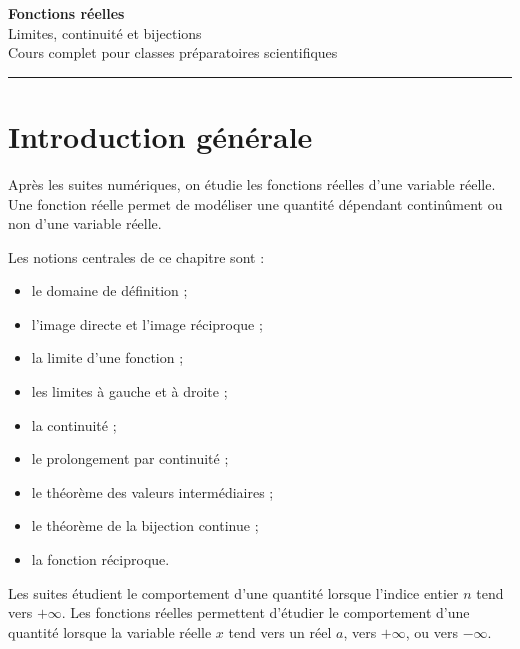 \documentclass[11pt,a4paper]{article}
\begin{document}
\begin{center}
    {\Huge \textbf{Fonctions réelles}}\\[2mm]
    {\Large Limites, continuité et bijections}\\[2mm]
    {\large Cours complet pour classes préparatoires scientifiques}\\[2mm]
    \rule{0.88\linewidth}{0.5pt}
\end{center}

\vspace{0.4cm}

\tableofcontents

\newpage

\section*{Introduction générale}

Après les suites numériques, on étudie les fonctions réelles d'une variable réelle.  
Une fonction réelle permet de modéliser une quantité dépendant continûment ou non d'une variable réelle.

Les notions centrales de ce chapitre sont :
\begin{itemize}
    \item le domaine de définition ;
    \item l'image directe et l'image réciproque ;
    \item la limite d'une fonction ;
    \item les limites à gauche et à droite ;
    \item la continuité ;
    \item le prolongement par continuité ;
    \item le théorème des valeurs intermédiaires ;
    \item le théorème de la bijection continue ;
    \item la fonction réciproque.
\end{itemize}

\begin{retenirbox}
Les suites étudient le comportement d'une quantité lorsque l'indice entier \(n\) tend vers \(+\infty\).  
Les fonctions réelles permettent d'étudier le comportement d'une quantité lorsque la variable réelle \(x\) tend vers un réel \(a\), vers \(+\infty\), ou vers \(-\infty\).
\end{retenirbox}
\end{document}
